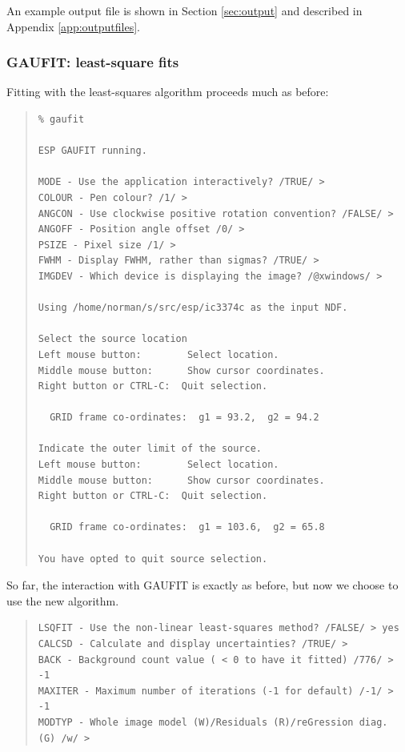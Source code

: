 \documentclass[twoside,11pt]{article}
\newenvironment{myquote}{\begin{quote}\begin{small}}{\end{small}\end{quote}}
\begin{document}
An example output file is shown in Section \ref{sec:output}
and described in Appendix \ref{app:outputfiles}.

\subsubsection{GAUFIT: least-square fits}

Fitting with the least-squares algorithm proceeds much as before:

\begin{myquote}
\begin{verbatim}
% gaufit

ESP GAUFIT running.

MODE - Use the application interactively? /TRUE/ > 
COLOUR - Pen colour? /1/ > 
ANGCON - Use clockwise positive rotation convention? /FALSE/ > 
ANGOFF - Position angle offset /0/ > 
PSIZE - Pixel size /1/ > 
FWHM - Display FWHM, rather than sigmas? /TRUE/ > 
IMGDEV - Which device is displaying the image? /@xwindows/ > 

Using /home/norman/s/src/esp/ic3374c as the input NDF.

Select the source location
Left mouse button:        Select location.
Middle mouse button:      Show cursor coordinates.
Right button or CTRL-C:  Quit selection.

  GRID frame co-ordinates:  g1 = 93.2,  g2 = 94.2

Indicate the outer limit of the source.
Left mouse button:        Select location.
Middle mouse button:      Show cursor coordinates.
Right button or CTRL-C:  Quit selection.

  GRID frame co-ordinates:  g1 = 103.6,  g2 = 65.8

You have opted to quit source selection.
\end{verbatim}
\end{myquote}

So far, the interaction with GAUFIT is exactly as before, but now we
choose to use the new algorithm.

\begin{myquote}
\begin{verbatim}
LSQFIT - Use the non-linear least-squares method? /FALSE/ > yes
CALCSD - Calculate and display uncertainties? /TRUE/ > 
BACK - Background count value ( < 0 to have it fitted) /776/ > -1
MAXITER - Maximum number of iterations (-1 for default) /-1/ > -1
MODTYP - Whole image model (W)/Residuals (R)/reGression diag. (G) /w/ >
\end{verbatim}
\end{myquote}
\end{document}
